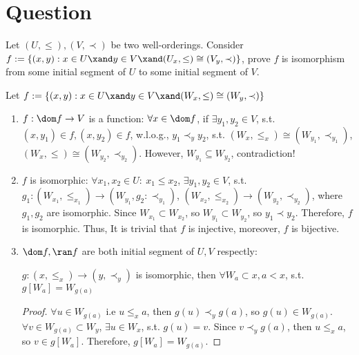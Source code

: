 \documentclass{ctexart}
\newif\ifpreface
\begin{document}
\large
\setlength{\baselineskip}{1.2em}
\ifpreface

\else
\maketitle
\fi
{}
\section{Question}
\begin{problem}
Let $(U,\le),(V,\prec)$ be two well-orderings. Consider $f:=\{(x,y):x\in U\xand y\in V\xand (U_x,\le)\cong (V_y,\prec)\}$, prove $f$ is isomorphism from some initial segment of $U$ to some initial segment of $V$. 
\end{problem}
\begin{solution}
Let $f:=\{(x,y):x\in U\xand y\in V\xand (W_x,\le)\cong(W_y,\prec)\}$
\begin{enumerate}
    \item $f:\dom f\to V$ is a function: $\forall x\in\dom f$, if $\exists y_1,y_2\in V$, s.t. $(x,y_1)\in f, (x,y_2)\in f$, w.l.o.g., $y_1\prec_{y} y_2$, s.t. $(W_x,\le_{x})\cong(W_{y_1},\prec_{y_1})$, $(W_x,\le)\cong(W_{y_2},\prec_{y_2})$. However, $W_{y_1}\subseteq W_{y_2}$, contradiction!
    \item $f$ is isomorphic:  $\forall x_1,x_2\in U:\ x_1\le x_2$, $\exists y_1,y_2\in V$, s.t. $g_1: (W_{x_1},\le_{x_1})\to(W_{y_1},g_2: \prec_{y_1})$, $(W_{x_2},\le_{x_2})\to(W_{y_2},\prec_{y_2})$, where $g_1,g_2$ are isomorphic. Since $W_{x_1}\subset W_{x_2}$, so $W_{y_1}\subset W_{y_2}$, so $y_1\prec y_2$. Therefore, $f$ is isomorphic. Thus, It is trivial that $f$ is injective, moreover, $f$ is bijective.
    \item $\dom f, \ran f$ are both initial segment of $U,V$ respectly:
    \begin{lemma}\label{lem:1}
        $g: (x,\le_{x})\to(y,\prec_{y})$ is isomorphic, then $\forall W_a\subset x, a<x$, s.t. $g[W_a]=W_{g(a)}$ 
    \end{lemma}
    \begin{proof}
        $\forall u\in W_{g(a)}$ i.e $u\le_{x} a$, then $g(u)\prec_{y} g(a)$, so $g(u)\in W_{g(a)}$. 
        $\forall v\in W_{g(a)}\subset W_{y}$, $\exists u\in W_x$, s.t. $g(u)=v$. Since $v\prec_{y} g(a)$, then $u\le_{x} a$, so $v\in g[W_a]$. Therefore, $g[W_a]=W_{g(a)}$.
    \end{proof}
        \begin{enumerate}

\end{enumerate}
\end{enumerate}
\end{solution}
\end{document}
